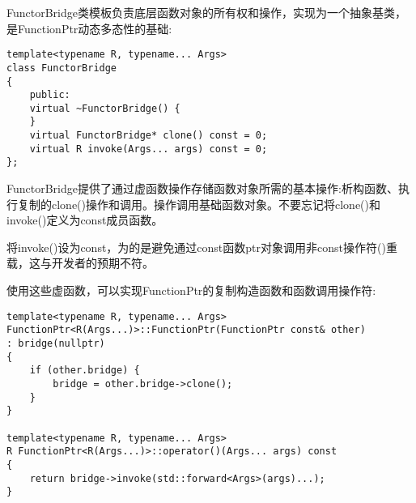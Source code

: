 FunctorBridge类模板负责底层函数对象的所有权和操作，实现为一个抽象基类，是FunctionPtr动态多态性的基础:

\begin{lstlisting}[style=styleCXX]
template<typename R, typename... Args>
class FunctorBridge
{
	public:
	virtual ~FunctorBridge() {
	}
	virtual FunctorBridge* clone() const = 0;
	virtual R invoke(Args... args) const = 0;
};
\end{lstlisting}

FunctorBridge提供了通过虚函数操作存储函数对象所需的基本操作:析构函数、执行复制的clone()操作和调用。操作调用基础函数对象。不要忘记将clone()和invoke()定义为const成员函数。

\begin{tcolorbox}[colback=webgreen!5!white,colframe=webgreen!75!black]
\hspace*{0.75cm}将invoke()设为const，为的是避免通过const函数ptr对象调用非const操作符()重载，这与开发者的预期不符。
\end{tcolorbox}

使用这些虚函数，可以实现FunctionPtr的复制构造函数和函数调用操作符:

\begin{lstlisting}[style=styleCXX]
template<typename R, typename... Args>
FunctionPtr<R(Args...)>::FunctionPtr(FunctionPtr const& other)
: bridge(nullptr)
{
	if (other.bridge) {
		bridge = other.bridge->clone();
	}
}

template<typename R, typename... Args>
R FunctionPtr<R(Args...)>::operator()(Args... args) const
{
	return bridge->invoke(std::forward<Args>(args)...);
}
\end{lstlisting}














































